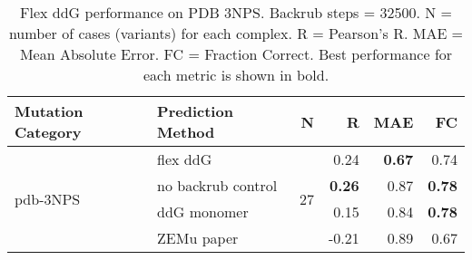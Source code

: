 \begin{table}
  \begin{tabular}{llrrrr}
\toprule
Mutation Category &   Prediction Method &   N &     R &  MAE &   FC \\
\midrule
 \multirow{ 4}{*}{pdb-3NPS} & flex ddG & \multirow{ 4}{*}{27} & 0.24 & \textbf{0.67} & 0.74  \\
 & no backrub control & & \textbf{0.26} & 0.87 & \textbf{0.78}  \\
 & ddG monomer & & 0.15 & 0.84 & \textbf{0.78}  \\
 & ZEMu paper & & -0.21 & 0.89 & 0.67  \\
\bottomrule
\end{tabular}
  \caption[Flex ddG performance on PDB 3NPS]{
    Flex ddG performance on PDB 3NPS. Backrub steps = 32500. N = number of cases (variants) for each complex. R = Pearson's R. MAE = Mean Absolute Error. FC = Fraction Correct. Best performance for each metric is shown in bold.
  } \label{tab:table-pdb-3NPS}
\end{table}
